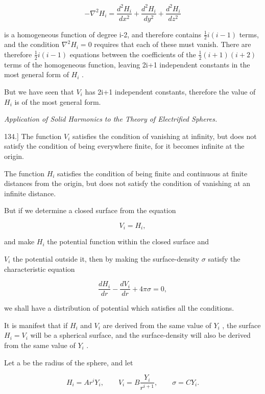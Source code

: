\documentclass[11pt,a4paper]{article}
\begin{document}
\[
- \nabla^2 H_i = \frac{d^2 H_i}{dx^2} + \frac{d^2 H_i}{dy^2} + \frac{d^2 H_i}{dz^2}
\]

is a homogeneous function of degree i-2, and therefore contains  $\frac{1}{2}i(i-1)$  terms, and the condition  $\nabla^2 H_i = 0$  requires that each of these must vanish. There are therefore  $\frac{1}{2}i(i-1)$  equations between the coefficients of the  $\frac{1}{2}(i+1)(i+2)$  terms of the homogeneous function, leaving 2i+1 independent constants in the most general form of  $H_i$ .

But we have seen that  $V_i$  has 2i+1 independent constants, therefore the value of  $H_i$  is of the most general form.

{\centering\itshape Application of Solid Harmonics to the Theory of Electrified Spheres.\par}

134.] The function  $V_i$  satisfies the condition of vanishing at infinity, but does not satisfy the condition of being everywhere finite, for it becomes infinite at the origin.

The function  $H_i$  satisfies the condition of being finite and continuous at finite distances from the origin, but does not satisfy the condition of vanishing at an infinite distance.

But if we determine a closed surface from the equation

\begin{equation}\tag{46}
V_i=H_i,
\end{equation}

and make $H_i$ the potential function within the closed surface and

 $V_i$  the potential outside it, then by making the surface-density  $\sigma$  satisfy the characteristic equation

\begin{equation}\tag{47}
\frac{dH_i}{dr}-\frac{dV_i}{dr}+4\pi\sigma=0,
\end{equation}

we shall have a distribution of potential which satisfies all the conditions.

It is manifest that if  $H_i$  and  $V_i$  are derived from the same value of  $Y_i$ , the surface  $H_i = V_i$  will be a spherical surface, and the surface-density will also be derived from the same value of  $Y_i$ .

Let a be the radius of the sphere, and let

\begin{equation}\tag{48}
H_i=Ar^iY_i,\qquad V_i=B\frac{Y_i}{r^{i+1}},\qquad \sigma=CY_i.
\end{equation}
\end{document}
